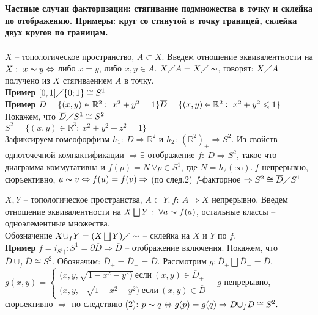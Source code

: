 \section{}
	\textbf{Частные случаи факторизации: стягивание подмножества в точку и склейка по отображению. Примеры: круг со стянутой в точку границей, склейка двух кругов по границам.}\\
	\\
	$X$ -- топологическое пространство, $A \subset X$. Введем отношение эквивалентности на $X:\ x\thicksim y \Leftrightarrow$ либо $x = y$, либо $x, y \in A$. $X\diagup A = X\diagup \thicksim$, говорят: $X\diagup A$ получено из $X$ стягиваением $A$ в точку.\\
	\textbf{Пример} $[0,1]\diagup\{0;1\} \cong S^1$\\
	\textbf{Пример} $D=\{(x,y)\in \mathbb{R}^2:\ x^2+y^2=1\}\\
	\overline{D}=\{(x,y)\in \mathbb{R}^2:\ x^2 + y^2 \leqslant 1\}$\\
	Покажем, что $\overline{D}\diagup S^1 \cong S^2$\\
	$S^2=\{(x,y)\in \mathbb{R}^3:\ x^2 + y^2 +z^2=1\}$\\
	Зафиксируем гомеофорфизм $h_1:\ D \Rightarrow \mathbb{R}^2$ и $h_2:\ {(\mathbb{R}^2)}_{+} \Rightarrow S^2$. Из свойств одноточечной компактификации $\Rightarrow \exists$ отображение $f:\ \overline{D} \Rightarrow S^2$, такое что диаграмма коммутативна и $f(p) = N\ \forall p \in S^1$, где $N=h_2(\infty).\ f$ непрерывно, сюръективно, $u \thicksim v \Leftrightarrow f(u) = f(v) \Rightarrow$ (по след.2) $f$-факторное $\Rightarrow S^2 \cong \overline{D}\diagup S^1$\\
	\begin{figure}[h]
	\end{figure}
	$X,Y$ -- топологическое  пространства, $A\subset Y.\ f:\ A \Rightarrow X$ непрерывно. Введем отношение эквивалентности на $X \bigsqcup Y:\ \forall a\thicksim f(a)$, остальные классы -- одноэлементные множества. \\
	Обозначение $X {\cup}_{f} Y=(X \bigsqcup Y)\diagup \thicksim$ -- склейка на $X$ и $Y$ по $f$.\\
	\textbf{Пример} $f = i_{S^1)}: S^1 = \partial \overline{D}\Rightarrow \overline{D}$ -- отображение включения. Покажем, что $\overline{D} {\cup}_{f} \overline{D} \cong S^2$.
	Обозначим: $\overline{D}_{+} = \overline{D}_{-} = \overline{D}$. Рассмотрим $g: \overline{D}_{+}\bigsqcup \overline{D}_{-}=\overline{D}$.\\
	$g(x,y)= 
	\begin{cases}
		(x,y,\sqrt{1 - x^2 - y^2)}\ \text{если}\ (x,y)\in \overline{D}_{+}\\ 
		(x,y, -\sqrt{1 - x^2 - y^2)}\ \text{если}\ (x,y)\in \overline{D}_{-}
	\end{cases}$
	$g$ непрерывно, сюръективно $\Rightarrow$ по следствию (2): $p\thicksim q \Leftrightarrow g(p) = g(q) \Rightarrow \overline{D} {\cup}_{f} \overline{D} \cong S^2.$
	\begin{figure}[h]
	\end{figure}



